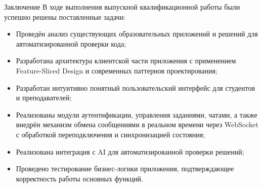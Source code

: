 \documentclass[aspectratio=169]{beamer}
\begin{document}
\begin{frame}{Заключение}
\small
В ходе выполнения выпускной квалификационной работы были успешно решены поставленные задачи:

\begin{itemize}
  \item Проведён анализ существующих образовательных приложений и решений для автоматизированной проверки кода;
  \item Разработана архитектура клиентской части приложения с применением Feature-Sliced Design и современных паттернов проектирования;
  \item Разработан интуитивно понятный пользовательский интерфейс для студентов и преподавателей;
  \item Реализованы модули аутентификации, управления заданиями, чатами, а также внедрён механизм обмена сообщениями в реальном времени через WebSocket с обработкой переподключения и синхронизацией состояния;
  \item Реализована интеграция с AI для автоматизированной проверки решений;
  \item Проведено тестирование бизнес-логики приложения, подтверждающее корректность работы основных функций.
\end{itemize}
\end{frame}
\end{document}
